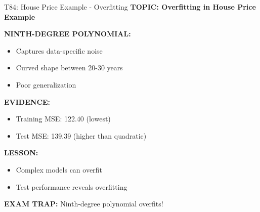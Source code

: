 \documentclass[8pt]{beamer}
\begin{document}
	\begin{frame}{T84: House Price Example - Overfitting}
		\fontsize{6.5}{7.5}\selectfont
		\textbf{TOPIC: Overfitting in House Price Example}
		
		\vspace{0.1cm}
		\textbf{NINTH-DEGREE POLYNOMIAL:}
		\begin{itemize}
			\item Captures data-specific noise
			\item Curved shape between 20-30 years
			\item Poor generalization
		\end{itemize}
		
		\vspace{0.1cm}
		\textbf{EVIDENCE:}
		\begin{itemize}
			\item Training MSE: 122.40 (lowest)
			\item Test MSE: 139.39 (higher than quadratic)
		\end{itemize}
		
		\vspace{0.1cm}
		\textbf{LESSON:}
		\begin{itemize}
			\item Complex models can overfit
			\item Test performance reveals overfitting
		\end{itemize}
		
		\textcolor{myred}{\textbf{EXAM TRAP:}} Ninth-degree polynomial \textcolor{myblue}{overfits}!
	\end{frame}
	
\end{document}
